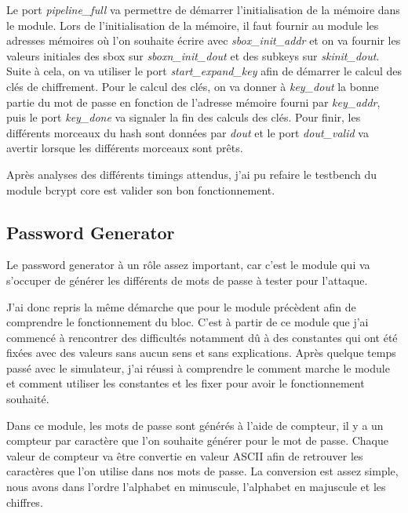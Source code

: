 Le port \textit{pipeline\_full} va permettre de démarrer l'initialisation de la mémoire dans le module. 
Lors de l'initialisation de la mémoire, il faut fournir au module les adresses mémoires où l'on souhaite écrire avec \textit{sbox\_init\_addr} et on va fournir les valeurs initiales des \gls{sbox} sur \textit{sboxn\_init\_dout} et des subkeys sur \textit{skinit\_dout}. 
Suite à cela, on va utiliser le port \textit{start\_expand\_key} afin de démarrer le calcul des clés de chiffrement. 
Pour le calcul des clés, on va donner à \textit{key\_dout} la bonne partie du mot de passe en fonction de l'adresse mémoire fourni par \textit{key\_addr}, puis le port \textit{key\_done} va signaler la fin des calculs des clés. 
Pour finir, les différents morceaux du hash sont données par \textit{dout} et le port \textit{dout\_valid} va avertir lorsque les différents morceaux sont prêts.

Après analyses des différents timings attendus, j'ai pu refaire le testbench du module bcrypt core est valider son bon fonctionnement.

\newpage

\subsection{Password Generator}

Le password generator à un rôle assez important, car c'est le module qui va s'occuper de générer les différents de mots de passe à tester pour l'attaque.

J'ai donc repris la même démarche que pour le module précèdent afin de comprendre le fonctionnement du bloc. 
C'est à partir de ce module que j'ai commencé à rencontrer des difficultés notamment dû à des constantes qui ont été fixées avec des valeurs sans aucun sens et sans explications. 
Après quelque temps passé avec le simulateur, j'ai réussi à comprendre le comment marche le module et comment utiliser les constantes et les fixer pour avoir le fonctionnement souhaité. 

Dans ce module, les mots de passe sont générés à l'aide de compteur, il y a un compteur par caractère que l'on souhaite générer pour le mot de passe. 
Chaque valeur de compteur va être convertie en valeur ASCII afin de retrouver les caractères que l'on utilise dans nos mots de passe. 
La conversion est assez simple, nous avons dans l'ordre l'alphabet en minuscule, l'alphabet en majuscule et les chiffres. 

